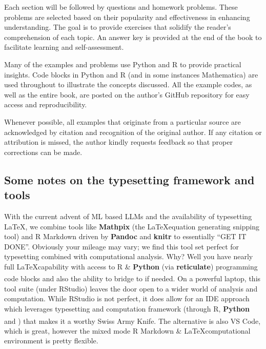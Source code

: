 \documentclass[
  12 pt,
  a4paper,
]{book}
\newcommand{\textpoppins}[1]{{\poppins #1}}
\newcommand{\textfluxreg}[1]{{\fluxreg #1}}
\newcommand{\textlato}[1]{{\lato #1}}
\newcommand{\textssp}[1]{{\ssp #1}}
\newcommand{\textcouriernew}[1]{{\couriernew #1}}
\newcommand{\textarial}[1]{{\arial #1}}
\newcommand{\textpalatino}[1]{{\palatino #1}}
\numberwithin{equation}{section}
\theoremstyle{plain}      %
\theoremstyle{definition} %
\theoremstyle{remark}     %
\theoremstyle{note}         %
\begin{document}
Each section will be followed by questions and homework problems. These
problems are selected based on their popularity and effectiveness in
enhancing understanding. The goal is to provide exercises that solidify
the reader's comprehension of each topic. An answer key is provided at
the end of the book to facilitate learning and self-assessment.

Many of the examples and problems use Python and R to provide practical
insights. Code blocks in Python and R (and in some instances
Mathematica) are used throughout to illustrate the concepts discussed.
All the example codes, as well as the entire book, are posted on the
author's GitHub repository for easy access and reproducibility.

Whenever possible, all examples that originate from a particular source
are acknowledged by citation and recognition of the original author. If
any citation or attribution is missed, the author kindly requests
feedback so that proper corrections can be made.

\hypertarget{some-notes-on-the-typesetting-framework-and-tools}{%
\subsection*{Some notes on the typesetting framework and
tools}\label{some-notes-on-the-typesetting-framework-and-tools}}

With the current advent of ML based LLMs and the availability of
typesetting \LaTeX , we combine tools like
\textbf{\large{\textpoppins{Mathpix}}} (the \LaTeX  equation generating
snipping tool) and \textcouriernew{R Markdown} driven by
\textbf{\large{\textarial{Pandoc}}} and
\textbf{\large{\textpalatino{knitr}}} to essentially ``GET IT DONE''.
Obviously your mileage may vary; we find this tool set perfect for
typesetting combined with computational analysis. Why? Well you have
nearly full \LaTeX  capability with access to R \&
\textbf{\large{\textfluxreg{Python}}} (via
\textbf{\large{\textlato{reticulate}}}) programming code blocks and also
the ability to bridge to
\text{\large{\textssp{MATHEMATICA}}}\textsuperscript{\textregistered} if
needed. On a powerful laptop, this tool suite (under RStudio) leaves the
door open to a wider world of analysis and computation. While RStudio is
not perfect, it does allow for an IDE approach which leverages
typesetting and computation framework (through R,
\textbf{\large{\textfluxreg{Python}}} and
\text{\large{\textssp{MATHEMATICA}}}\textsuperscript{\textregistered})
that makes it a worthy Swiss Army Knife. The alternative is also VS
Code, which is great, however the mixed mode \textcouriernew{R Markdown}
\& \LaTeX  computational environment is pretty flexible.
\end{document}
